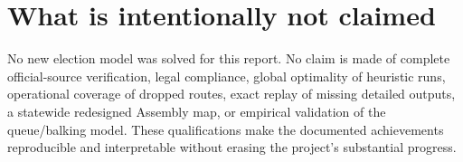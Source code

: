 \documentclass[11pt,a4paper,oneside]{report}
\begin{document}
\section{What is intentionally not claimed}
No new election model was solved for this report. No claim is made of complete official-source verification, legal compliance, global optimality of heuristic runs, operational coverage of dropped routes, exact replay of missing detailed outputs, a statewide redesigned Assembly map, or empirical validation of the queue/balking model. These qualifications make the documented achievements reproducible and interpretable without erasing the project's substantial progress.
\end{document}
